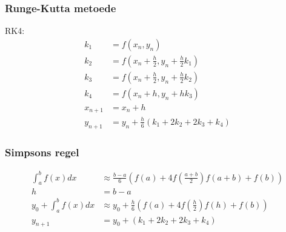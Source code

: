 \begin{frame}
\frametitle{Runge-Kutta metoede}
RK4:\\
\begin{align*}
k_1&=f(x_n,y_n)\\
k_2&=f(x_n+\frac{h}{2},y_n+\frac{h}{2}k_1)\\
k_3&=f(x_n+\frac{h}{2},y_n+\frac{h}{2}k_2)\\
k_4&=f(x_n+h,y_n+h k_3)\\
x_{n+1}&=x_n+h\\
y_{n+1}&=y_n+\frac{h}{6}(k_1+2k_2+2k_3+k_4)
\end{align*}
\end{frame}

\begin{frame}
\frametitle{Simpsons regel}
\begin{align*}
\int_a^bf(x)dx &\approx \frac{b-a}{6} \left( f(a)+4f \left( \frac{a+b}{2} \right) f(a+b)+f(b) \right)\\
h&=b-a\\
y_0+\int_a^bf(x)dx &\approx y_0+ \frac{h}{6} \left( f(a)+4f \left( \frac{h}{2} \right) f(h)+f(b) \right)\\
y_{n+1}&=y_0+(k_1+2k_2+2k_3+k_4)
\end{align*}
\end{frame}

